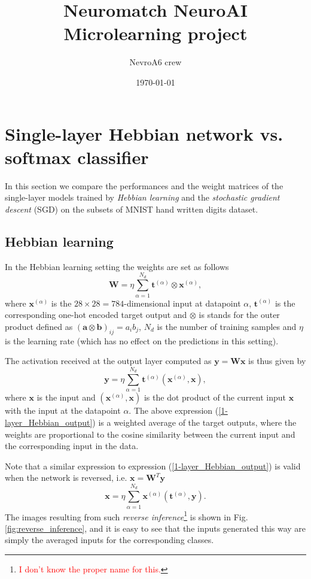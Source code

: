 \documentclass[a4paper, 11pt]{article}
\title{\textbf{Neuromatch NeuroAI Microlearning project}}
\date{\today}
\author{NevroA6 crew}
\begin{document}
\maketitle

\begin{abstract}
\end{abstract}

\tableofcontents

\section{Single-layer Hebbian network vs. softmax classifier}
In this section we compare the performances and the weight matrices of the single-layer models trained by {\it Hebbian learning} and the {\it stochastic gradient descent} (SGD) on the subsets of MNIST hand written digits dataset.
\subsection{Hebbian learning}
In the Hebbian learning setting the weights are set as follows
\begin{equation} \label{Hebbian_weights}
  \mathbf W = \eta\sum_{\alpha=1}^{N_d} \mathbf t^{(\alpha)} \otimes \mathbf x^{(\alpha)},
\end{equation}
where $\mathbf x^{(\alpha)}$ is the $28\times 28=784$-dimensional input at datapoint $\alpha$, $\mathbf t^{(\alpha)}$ is the corresponding one-hot encoded target output and $\otimes$ is stands for the outer product defined as $(\mathbf a\otimes \mathbf b)_{ij} = a_ib_j$, ${N_d}$ is the number of training samples and $\eta$ is the learning rate (which has no effect on the predictions in this setting).

The activation received at the output layer computed as $\mathbf y = \mathbf W\mathbf x$ is thus given by
\begin{equation} \label{1-layer_Hebbian_output}
  \mathbf y = \eta \sum_{\alpha=1}^{N_d}\mathbf t^{(\alpha)}(\mathbf x^{(\alpha)},\mathbf x),
\end{equation}
where $\mathbf x$ is the input and $(\mathbf x^{(\alpha)},\mathbf x)$ is the dot product of the current input $\mathbf x$ with the input at the datapoint $\alpha$. The above expression (\ref{1-layer_Hebbian_output}) is a weighted average of the target outputs, where the weights are proportional to the cosine similarity between the current input and the corresponding input in the data.

Note that a similar expression to expression (\ref{1-layer_Hebbian_output}) is valid when the network is reversed, i.e. $\mathbf x = \mathbf W^T\mathbf y$
\begin{equation}
  \mathbf x = \eta\sum_{\alpha=1}^{N_d}\mathbf x^{(\alpha)}(\mathbf t^{(\alpha)},\mathbf y).
\end{equation}
The images resulting from such {\it reverse inference}\footnote{\textcolor{red}{I don't know the proper name for this.}} is shown in Fig.\ref{fig:reverse_inference}, and it is easy to see that the inputs generated this way are simply the averaged inputs for the corresponding classes.
\end{document}
